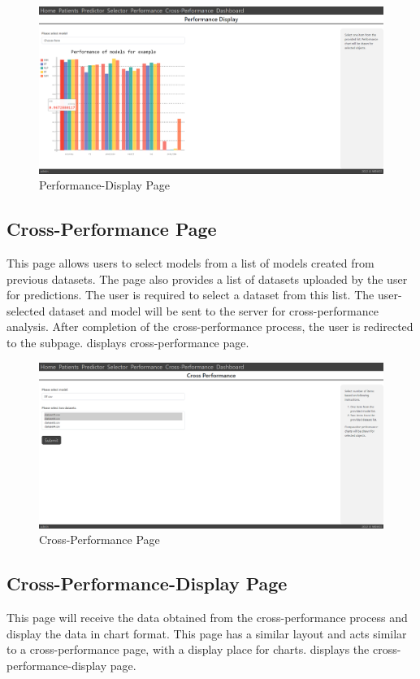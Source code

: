 \begin{figure}[H]
  \centering
  \includegraphics[width=0.7\columnwidth]{media/website/pages/performance_display.png}
  \caption{Performance-Display Page}
  \label{fig:web_performance_display_page}
\end{figure}

\subsection{Cross-Performance Page} \label{subsec:cross_performance_page}
This page allows users to select models from a list of models created from previous datasets. The page also provides a list of datasets uploaded by the user for predictions. The user is required to select a dataset from this list. The user-selected dataset and model will be sent to the server for cross-performance analysis. After completion of the cross-performance process, the user is redirected to the subpage.  displays cross-performance page.

\begin{figure}[H]
  \centering
  \includegraphics[width=0.7\columnwidth]{media/website/pages/cross_performance_selection.png}
  \caption{Cross-Performance Page}
  \label{fig:web_cross_performance_page}
\end{figure}

\subsection{Cross-Performance-Display Page} \label{subsec:cross_performance_display Page} This page will receive the data obtained from the cross-performance process and display the data in chart format. This page has a similar layout and acts similar to a cross-performance page, with a display place for charts.  displays the cross-performance-display page.


